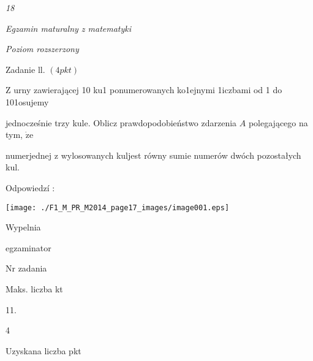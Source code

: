 \documentclass[a4paper,12pt]{article}
\begin{document}
{\it 18}

{\it Egzamin maturalny z matematyki}

{\it Poziom rozszerzony}

Zadanie ll. $(4pkt)$

$\mathrm{Z}$ urny zawierającej 10 ku1 ponumerowanych ko1ejnymi 1iczbami od 1 do 101osujemy

jednocześnie trzy kule. Oblicz prawdopodobieństwo zdarzenia $A$ polegającego na tym, $\dot{\mathrm{z}}\mathrm{e}$

numerjednej z wylosowanych kuljest równy sumie numerów dwóch pozostałych kul.

Odpowiedzí :
\begin{center}
\texttt{[image: ./F1\_M\_PR\_M2014\_page17\_images/image001.eps]}
\end{center}
Wypelnia

egzaminator

Nr zadania

Maks. liczba kt

11.

4

Uzyskana liczba pkt
\end{document}
